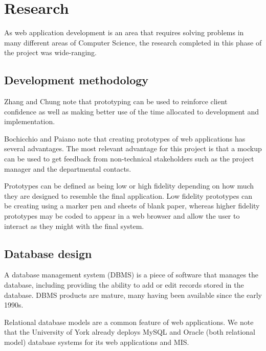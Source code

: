 \documentclass[]{scrartcl}
\begin{document}
\section{Research}


As web application development is an area that requires solving problems in
many different areas of Computer Science, the research completed in this phase
of the project was wide-ranging.

\subsection{Development methodology}


Zhang and Chung \cite{MODFM_2003} note that prototyping can be used to reinforce client
confidence as well as making better use of the time allocated to development
and implementation.

Bochicchio and Paiano \cite{PrototypingWebApplications_2000} note that
creating prototypes of web applications has several advantages.
The most relevant advantage for this project is that a mockup can be used to
get feedback from non-technical stakeholders such as the project manager and
the departmental contacts.

Prototypes can be defined as being low or high fidelity depending on how much
they are designed to resemble the final application. Low fidelity prototypes
can be creating using a marker pen and sheets of blank paper, whereas higher
fidelity prototypes may be coded to appear in a web browser and allow the user
to interact as they might with the final system.

\subsection{Database design}

A database management system (DBMS) is a piece of software that manages the database, including providing the ability to add or edit records stored in the database. DBMS products are mature, many having been available since the early 1990s.

Relational database models are a common feature of web applications. We note that the University of York already deploys MySQL and Oracle (both relational model) database systems for its web applications and MIS.
\end{document}
